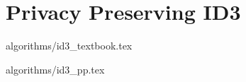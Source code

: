 \section{Privacy Preserving ID3}\label{s:id3}

{algorithms/id3_textbook.tex}


{algorithms/id3_pp.tex}

